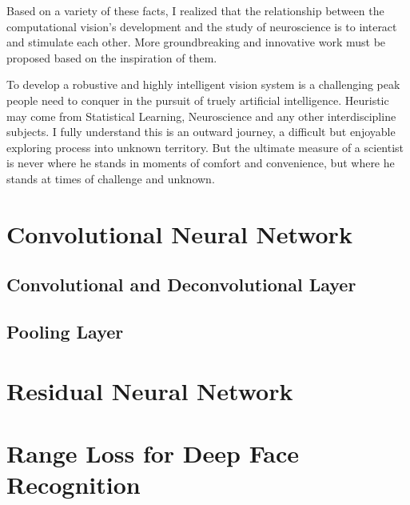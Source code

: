 Based on a variety of these facts, I realized that the relationship between the {computational vision}'s development and the study of {neuroscience} is to interact and stimulate each other. More groundbreaking and innovative work must be proposed based on the inspiration of them. 

To develop a robustive and highly intelligent vision system is a challenging peak people need to conquer in the pursuit of truely artificial intelligence. Heuristic may come from {Statistical Learning, Neuroscience} and any other interdiscipline subjects. I fully understand this is an
outward journey, a difficult but enjoyable exploring process into  unknown territory.
 But the ultimate measure of a scientist is never where he stands in moments of comfort and convenience, but where he stands at times of challenge and unknown. 


\section{ Convolutional Neural Network}



\subsection{Convolutional and Deconvolutional Layer}



\subsection{Pooling Layer}

\section{Residual Neural Network}


\section{Range Loss for Deep Face Recognition}






